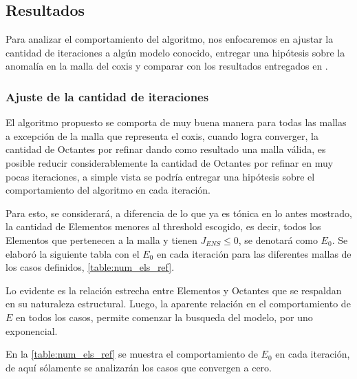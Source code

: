 \subsection{Resultados}

Para analizar el comportamiento del algoritmo, nos enfocaremos en ajustar la cantidad de iteraciones a algún modelo conocido, entregar una hipótesis sobre la anomalía en la malla del coxis y comparar con los resultados entregados en \cite{daines2018repairing}.

\subsubsection{Ajuste de la cantidad de iteraciones}

El algoritmo propuesto se comporta de muy buena manera para todas las mallas a excepción de la malla que representa el coxis, cuando logra converger, la cantidad de Octantes por refinar dando como resultado una malla válida, es posible reducir considerablemente la cantidad de Octantes por refinar en muy pocas iteraciones, a simple vista se podría entregar una hipótesis sobre el comportamiento del algoritmo en cada iteración.

Para esto, se considerará, a diferencia de lo que ya es tónica en lo antes mostrado, la cantidad de Elementos menores al threshold escogido, es decir, todos los Elementos que pertenecen a la malla y tienen $J_{ENS} \leq 0$, se denotará como $E_0$. Se elaboró la siguiente tabla con el $E_0$ en cada iteración para las diferentes mallas de los casos definidos, \autoref{table:num_els_ref}.

Lo evidente es la relación estrecha entre Elementos y Octantes que se respaldan en su naturaleza estructural. Luego, la aparente relación en el comportamiento de $E$ en todos los casos, permite comenzar la busqueda del modelo, por uno exponencial.


En la \autoref{table:num_els_ref} se muestra el comportamiento de $E_0$ en cada iteración, de aquí sólamente se analizarán los casos que convergen a cero.

